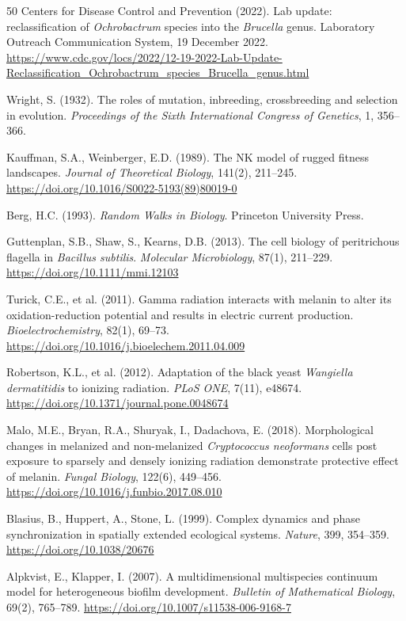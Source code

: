 \documentclass[11pt]{article}
\begin{document}
\begin{thebibliography}{50}
Centers for Disease Control and Prevention (2022).
Lab update: reclassification of \textit{Ochrobactrum} species into the \textit{Brucella} genus.
Laboratory Outreach Communication System, 19 December 2022.
\url{https://www.cdc.gov/locs/2022/12-19-2022-Lab-Update-Reclassification_Ochrobactrum_species_Brucella_genus.html}

Wright, S. (1932).
The roles of mutation, inbreeding, crossbreeding and selection in evolution.
\textit{Proceedings of the Sixth International Congress of Genetics}, 1, 356--366.

Kauffman, S.A., Weinberger, E.D. (1989).
The NK model of rugged fitness landscapes.
\textit{Journal of Theoretical Biology}, 141(2), 211--245.
\url{https://doi.org/10.1016/S0022-5193(89)80019-0}

Berg, H.C. (1993).
\textit{Random Walks in Biology}.
Princeton University Press.

Guttenplan, S.B., Shaw, S., Kearns, D.B. (2013).
The cell biology of peritrichous flagella in \textit{Bacillus subtilis}.
\textit{Molecular Microbiology}, 87(1), 211--229.
\url{https://doi.org/10.1111/mmi.12103}

Turick, C.E., et al. (2011).
Gamma radiation interacts with melanin to alter its oxidation-reduction potential and
results in electric current production.
\textit{Bioelectrochemistry}, 82(1), 69--73.
\url{https://doi.org/10.1016/j.bioelechem.2011.04.009}

Robertson, K.L., et al. (2012).
Adaptation of the black yeast \textit{Wangiella dermatitidis} to ionizing radiation.
\textit{PLoS ONE}, 7(11), e48674.
\url{https://doi.org/10.1371/journal.pone.0048674}

Malo, M.E., Bryan, R.A., Shuryak, I., Dadachova, E. (2018).
Morphological changes in melanized and non-melanized \textit{Cryptococcus neoformans} cells
post exposure to sparsely and densely ionizing radiation demonstrate protective effect of
melanin.
\textit{Fungal Biology}, 122(6), 449--456.
\url{https://doi.org/10.1016/j.funbio.2017.08.010}

Blasius, B., Huppert, A., Stone, L. (1999).
Complex dynamics and phase synchronization in spatially extended ecological systems.
\textit{Nature}, 399, 354--359.
\url{https://doi.org/10.1038/20676}

Alpkvist, E., Klapper, I. (2007).
A multidimensional multispecies continuum model for heterogeneous biofilm development.
\textit{Bulletin of Mathematical Biology}, 69(2), 765--789.
\url{https://doi.org/10.1007/s11538-006-9168-7}


\end{thebibliography}
\end{document}
